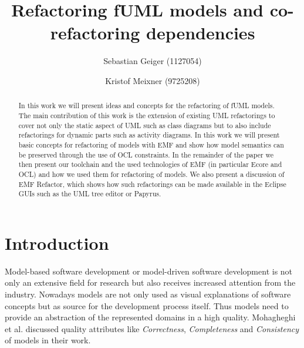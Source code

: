 \documentclass{llncs}
\begin{document}
\pagestyle{plain}

\title{Refactoring fUML models and co-refactoring dependencies}


\author{Sebastian Geiger (1127054) \and Kristof Meixner (9725208)}
\maketitle

\begin{abstract}
In this work we will present ideas and concepts for the refactoring of fUML models. The main contribution of this work is 
the extension of existing UML refactorings to cover not only the static aspect of UML such as class diagrams but to also 
include refactorings for dynamic
parts such as activity diagrams. In this work we will present basic concepts for refactoring of models with EMF and show how model semantics can be
preserved through the use of OCL constraints. In the remainder of the paper we then present our toolchain and the used technologies
of EMF (in particular Ecore and OCL) and how we used them for refactoring of models. We also present a discussion of EMF Refactor, which shows how such refactorings
can be made available in the Eclipse GUIs such as the UML tree editor or Papyrus.
\end{abstract}

\tableofcontents
\newpage


\section{Introduction}

Model-based software development or model-driven software development is not only an extensive field for research but
also receives increased attention from the industry. Nowadays models are not only used as visual explanations of
software concepts but as source for the development process itself. Thus models need to provide an abstraction of
the represented domains in a high quality. Mohagheghi et al. \cite{DBLP:journals/infsof/MohagheghiDN09} discussed 
quality attributes like \textit{Correctness}, \textit{Completeness} and \textit{Consistency} of models in their work.
\end{document}
